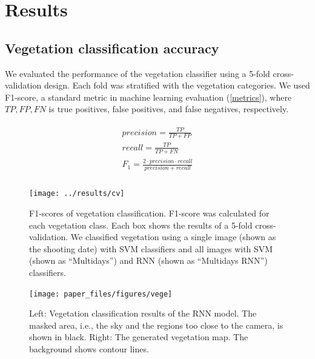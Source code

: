 \documentclass{article}
\begin{document}
\hypertarget{results}{%
\section{Results}\label{results}}

\hypertarget{vegetation-classification-accuracy}{%
\subsection{Vegetation classification accuracy}\label{vegetation-classification-accuracy}}

We evaluated the performance of the vegetation classifier using a 5-fold cross-validation design. Each fold was stratified with the vegetation categories. We used F1-score, a standard metric in machine learning evaluation (\ref{metrics}), where \(TP, FP, FN\) is true positives, false positives, and false negatives, respectively.

\begin{align}
\label{metrics}
  \begin{gathered}
  precision = \frac{TP}{TP + FP} \\
  recall = \frac{TP}{TP + FN} \\
  F_1 = \frac{2 \cdot precision \cdot recall}{precision + recall} \\
  \end{gathered}
\end{align}



\begin{figure}
\texttt{[image: ../results/cv]} \caption{F1-scores of vegetation classification. F1-score was calculated for each vegetation class. Each box shows the results of a 5-fold cross-validation. We classified vegetation using a single image (shown as the shooting date) with SVM classifiers and all images with SVM (shown as ``Multidays'') and RNN (shown as ``Multidays RNN'') classifiers.}\label{fig:vegeacc}
\end{figure}



\begin{figure}
\texttt{[image: paper\_files/figures/vege]} \caption{Left: Vegetation classification results of the RNN model. The masked area, i.e., the sky and the regions too close to the camera, is shown in black. Right: The generated vegetation map. The background shows contour lines.}\label{fig:vegetation}
\end{figure}
\end{document}
